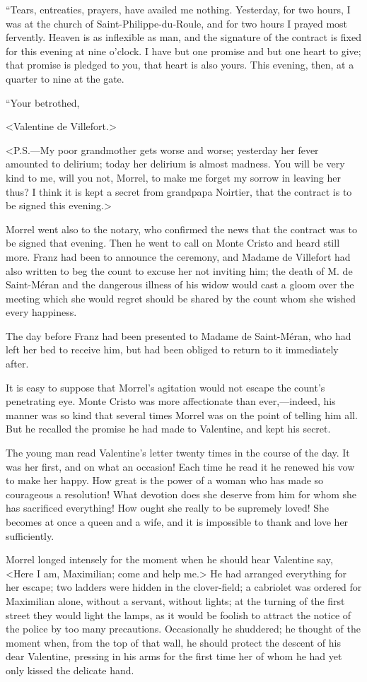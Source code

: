  “Tears, entreaties, prayers, have availed me nothing. Yesterday, for two hours, I was at the church of Saint-Philippe-du-Roule, and for two hours I prayed most fervently. Heaven is as inflexible as man, and the signature of the contract is fixed for this evening at nine o'clock. I have but one promise and but one heart to give; that promise is pledged to you, that heart is also yours. This evening, then, at a quarter to nine at the gate. 

 “Your betrothed, 

 <Valentine de Villefort.> 

 <P.S.—My poor grandmother gets worse and worse; yesterday her fever amounted to delirium; today her delirium is almost madness. You will be very kind to me, will you not, Morrel, to make me forget my sorrow in leaving her thus? I think it is kept a secret from grandpapa Noirtier, that the contract is to be signed this evening.> 

 Morrel went also to the notary, who confirmed the news that the contract was to be signed that evening. Then he went to call on Monte Cristo and heard still more. Franz had been to announce the ceremony, and Madame de Villefort had also written to beg the count to excuse her not inviting him; the death of M. de Saint-Méran and the dangerous illness of his widow would cast a gloom over the meeting which she would regret should be shared by the count whom she wished every happiness. 

 The day before Franz had been presented to Madame de Saint-Méran, who had left her bed to receive him, but had been obliged to return to it immediately after. 

 It is easy to suppose that Morrel's agitation would not escape the count's penetrating eye. Monte Cristo was more affectionate than ever,—indeed, his manner was so kind that several times Morrel was on the point of telling him all. But he recalled the promise he had made to Valentine, and kept his secret. 

 The young man read Valentine's letter twenty times in the course of the day. It was her first, and on what an occasion! Each time he read it he renewed his vow to make her happy. How great is the power of a woman who has made so courageous a resolution! What devotion does she deserve from him for whom she has sacrificed everything! How ought she really to be supremely loved! She becomes at once a queen and a wife, and it is impossible to thank and love her sufficiently. 

 Morrel longed intensely for the moment when he should hear Valentine say, <Here I am, Maximilian; come and help me.> He had arranged everything for her escape; two ladders were hidden in the clover-field; a cabriolet was ordered for Maximilian alone, without a servant, without lights; at the turning of the first street they would light the lamps, as it would be foolish to attract the notice of the police by too many precautions. Occasionally he shuddered; he thought of the moment when, from the top of that wall, he should protect the descent of his dear Valentine, pressing in his arms for the first time her of whom he had yet only kissed the delicate hand. 


